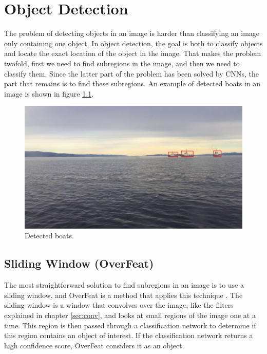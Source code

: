 


\chapter{Object Detection}
\label{sec:obj_det}
The problem of detecting objects in an image is harder than classifying an image only containing one object. In object detection, the goal is both to classify objects and locate the exact location of the object in the image. That makes the problem twofold, first we need to find subregions in the image, and then we need to classify them. Since the latter part of the problem has been solved by CNNs, the part that remains is to find these subregions. An example of detected boats in an image is shown in figure \ref{fig:boat_detection}.

\begin{figure}[h!]
    \centering
    \includegraphics[width = 0.8 \textwidth]{results/video/video3/frame677.jpg}
    \caption{Detected boats.}
    \label{fig:boat_detection}
\end{figure}


\section{Sliding Window (OverFeat)}
The most straightforward solution to find subregions in an image is to use a sliding window, and OverFeat is a method that applies this technique \citep{Sermanet2013}. The sliding window is a window that convolves over the image, like the filters explained in chapter \ref{sec:conv}, and looks at small regions of the image one at a time. This region is then passed through a classification network to determine if this region contains an object of interest. If the classification network returns a high confidence score, OverFeat considers it as an object. 

